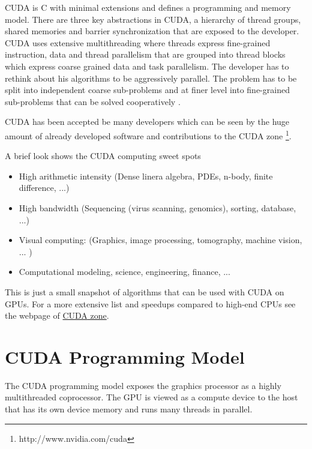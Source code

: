 \Gls{CUDA} is C with minimal extensions and defines a programming and memory model.
There are three key abstractions in \gls{CUDA}, a hierarchy of thread groups, shared
memories and barrier synchronization \citep{citeulike:3325943} that are exposed
to the developer. \Gls{CUDA} uses extensive multithreading where threads express
fine-grained instruction, data and thread parallelism that are grouped into
thread blocks which express coarse grained data and task parallelism. The
developer has to rethink about his algorithms to be aggressively parallel.
The problem has to be split into independent coarse sub-problems and at finer
level into fine-grained sub-problems that can be solved cooperatively
\citep{citeulike:3325943}.

\Gls{CUDA} has been accepted be many developers which can be seen by the huge
amount of already developed software and contributions to the \gls{CUDA}
zone \footnote{http://www.nvidia.com/cuda}.

A brief look shows the \gls{CUDA} computing sweet 
spots\citep{citeulike:3839013}

\begin{itemize}
	\item High arithmetic intensity (Dense linera algebra, PDEs, n-body, 
			finite difference, ...) 
	\item High bandwidth (Sequencing (virus scanning, genomics), sorting, 			
			database, ...) 
	\item Visual computing: (Graphics, image processing, tomography, 
			machine vision, ... ) 
	\item Computational modeling, science, engineering, finance, ... 			
\end{itemize} 

This is just a small snapshot of algorithms that can be used with \gls{CUDA} on
\glspl{GPU}. For a more extensive list and speedups compared to high-end
\glspl{CPU} see the webpage of {}
\href{http://www.nvidia.com/cuda}{\gls{CUDA} zone}. 

\section{CUDA Programming Model}%
\label{sub:cuda_programming_model} 
The \gls{CUDA} programming model exposes the graphics processor as a highly
multithreaded coprocessor. The \gls{GPU} is viewed as a compute device to the
host that has its own device memory and runs many threads in parallel.

